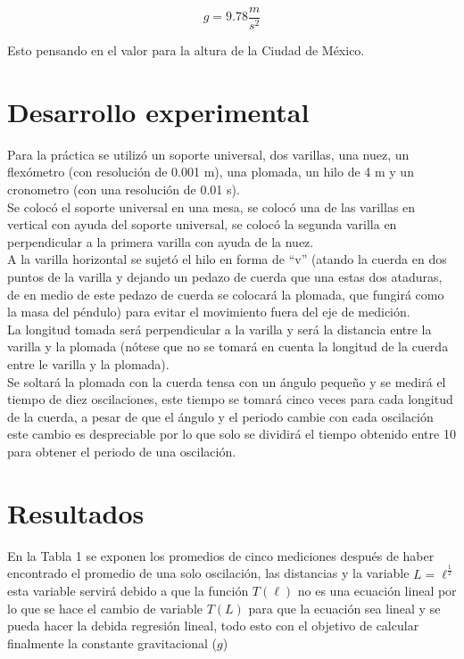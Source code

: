 \documentclass[12pt,a4paper]{article}
\begin{document}
\[g = 9.78 \frac{m}{s^2}\]

Esto pensando en el valor para la altura de la Ciudad de México. 

\section{Desarrollo experimental}

Para la práctica se utilizó un soporte universal, dos varillas, una nuez, un flexómetro (con resolución de 0.001 m), una plomada, un hilo de 4 m y un cronometro (con una resolución de 0.01 s).\\
Se colocó el soporte universal en una mesa, se colocó una de las varillas en vertical con ayuda del soporte universal, se colocó la segunda varilla en perpendicular a la primera varilla con ayuda de la nuez. \\
A la varilla horizontal se sujetó el hilo en forma de “v” (atando la cuerda en dos puntos de la varilla y dejando un pedazo de cuerda que una estas dos ataduras, de en medio de este pedazo de cuerda se colocará la plomada, que fungirá como la masa del péndulo) para evitar el movimiento fuera del eje de medición. \\
La longitud tomada será perpendicular a la varilla y será la distancia entre la varilla y la plomada (nótese que no se tomará en cuenta la longitud de la cuerda entre le varilla y la plomada).\\

Se soltará la plomada con la cuerda tensa con un ángulo pequeño y se medirá el tiempo de diez oscilaciones, este tiempo se tomará cinco veces para cada longitud de la cuerda, a pesar de que el ángulo y el periodo cambie con cada oscilación este cambio es despreciable por lo que solo se dividirá el tiempo obtenido entre 10 para obtener el periodo de una oscilación. \\

\section{Resultados}

En la Tabla 1 se exponen los promedios de cinco mediciones después de haber encontrado el promedio de una solo oscilación, las distancias y la variable $L = \ell^{\frac{1}{2}}$ esta variable servirá debido a que la función $T(\ell)$ no es una ecuación lineal por lo que se hace el cambio de variable $T(L)$ para que la ecuación sea lineal y se pueda hacer la debida regresión lineal, todo esto con el objetivo de calcular finalmente la constante gravitacional ($g$)
\end{document}

